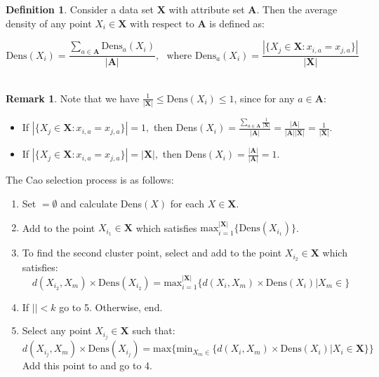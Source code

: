 \documentclass{article}
\theoremstyle{definition}
\newtheorem{definition}{Definition}[section]
\newtheorem*{remark}{Remark}
\begin{document}
\begin{definition}\label{def:density}	
	Consider a data set $\textbf{X}$ with attribute set $\textbf{A}$. Then the average density of any point $X_i \in \textbf{X} \text{ with respect to } \textbf{A}$ is defined as:
	
	\[
	\text{Dens}(X_i) = \frac{\sum_{a \in \textbf{A}} \text{Dens}_{a}(X_i)}{|\textbf{A}|}, \ \ \
	\text{where \ Dens}_{a}(X_i) = \frac{|\{X_j \in \textbf{X} : x_{i,a} = x_{j,a}\}|}{|\textbf{X}|}
	\] \\		
\end{definition} 

\begin{remark}
	Note that we have $ \frac{1}{|\textbf{X}|} \leq \text{Dens}(X_i) \leq 1$, since for any $a \in \textbf{A}$:		

	\begin{itemize}	
		\item If $|\{X_j \in \textbf{X} : x_{i,a} = x_{j,a}\}| = 1,$ then Dens$(X_i) = \frac{\sum_{a \in \textbf{A}} \frac{1}{|\textbf{X}|}}{|\textbf{A}|} = \frac{|\textbf{A}|}{|\textbf{A}||\textbf{X}|} = \frac{1}{|\textbf{X}|}$.
			
		\item If $|\{X_j \in \textbf{X} : x_{i,a} = x_{j,a}\}| = |\textbf{X}|,$ then Dens$(X_i) = \frac{|\textbf{A}|}{|\textbf{A}|} = 1$.	
	\end{itemize}
\end{remark}


\noindent The Cao selection process is as follows:

\begin{enumerate}
	\item Set $ = \emptyset$ and calculate Dens$(X)$ for each $X \in \textbf{X}$.
	
	\item Add to  the point $X_{i_1} \in \textbf{X}$ which satisfies $\text{max}_{i=1}^{|\textbf{X}|} \{ \text{Dens}(X_{i_1}) \}$.
	
	\item To find the second cluster point, select and add to  the point $X_{i_2} \in \textbf{X}$ which satisfies:
	 $$
	 d(X_{i_2}, X_m) \times \text{Dens}(X_{i_2}) = \text{max}_{i=1}^{|\textbf{X}|} \{ d(X_{i}, X_m) \times \text{Dens}(X_{i}) | X_m \in  \}
	 $$
	
	\item If $|| < k$ go to 5. Otherwise, end.
	
	\item Select any point $X_{i_j} \in \textbf{X}$ such that:
	 $$
	 d(X_{i_j}, X_m) \times \text{Dens}(X_{i_j}) = \text{max} \{ \text{min}_{X_m \in }  \{d(X_{i}, X_m) \times \text{Dens}(X_i) | X_i \in \textbf{X} \}\}
	 $$
	 Add this point to  and go to 4.
\end{enumerate}
\end{document}
